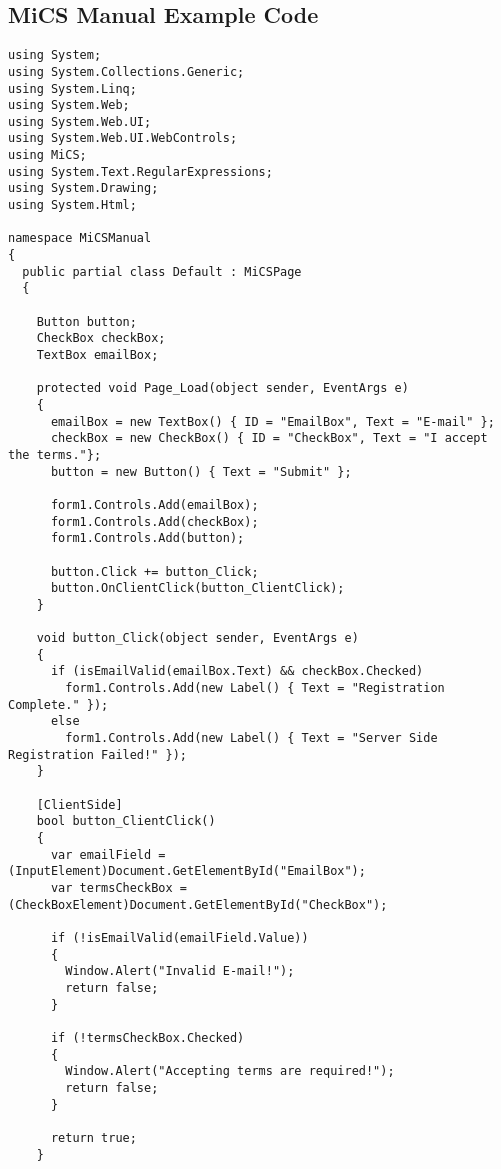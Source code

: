 \begin{appendices}
\chapter{MiCS Manual Example Code}
\label{AppendixA}

\begin{lstlisting}[language=CSharp,classoffset=1,morekeywords={Default, MiCSPage, Button, CheckBox, TextBox, EventArgs, Label, ClientSide, MixedSide, InputElement, CheckboxElement, Document, Window, Regex}]
using System;
using System.Collections.Generic;
using System.Linq;
using System.Web;
using System.Web.UI;
using System.Web.UI.WebControls;
using MiCS;
using System.Text.RegularExpressions;
using System.Drawing;
using System.Html;

namespace MiCSManual
{
  public partial class Default : MiCSPage
  {
    
    Button button;
    CheckBox checkBox;
    TextBox emailBox;

    protected void Page_Load(object sender, EventArgs e)
    {
      emailBox = new TextBox() { ID = "EmailBox", Text = "E-mail" };
      checkBox = new CheckBox() { ID = "CheckBox", Text = "I accept the terms."};
      button = new Button() { Text = "Submit" };

      form1.Controls.Add(emailBox);
      form1.Controls.Add(checkBox);
      form1.Controls.Add(button);

      button.Click += button_Click;
      button.OnClientClick(button_ClientClick);
    }

    void button_Click(object sender, EventArgs e)
    {
      if (isEmailValid(emailBox.Text) && checkBox.Checked)
        form1.Controls.Add(new Label() { Text = "Registration Complete." });
      else
        form1.Controls.Add(new Label() { Text = "Server Side Registration Failed!" });
    }

    [ClientSide]
    bool button_ClientClick()
    {
      var emailField = (InputElement)Document.GetElementById("EmailBox");
      var termsCheckBox = (CheckBoxElement)Document.GetElementById("CheckBox");

      if (!isEmailValid(emailField.Value))
      {
        Window.Alert("Invalid E-mail!");
        return false;
      }

      if (!termsCheckBox.Checked)
      {
        Window.Alert("Accepting terms are required!");
        return false;
      }

      return true;
    }


\end{lstlisting}
\end{appendices}
